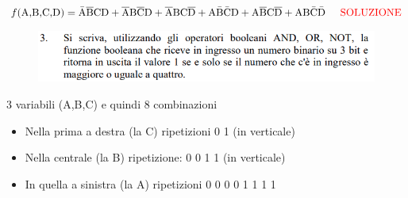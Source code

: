 \enlargethispage{90pt}
$ f(\text{A,B,C,D}) = \bar{\text{A}}\overline{\text{B}}\text{C}\text{D} + \overline{\text{A}}\text{B}\overline{\text{C}}\text{D} + \overline{\text{A}}\text{B}\text{C}\overline{\text{D}} + \text{A}\bar{\text{B}}\bar{\text{C}}\text{D} + \text{A}\overline{\text{B}}\text{C}\overline{\text{D}} + \text{AB}\bar{\text{C}}\bar{\text{D}} \hspace{0.5cm}\textrm{\color{red} SOLUZIONE}$ \\


\newpage

\begin{figure}[ht]
	\includegraphics[width=1\linewidth]{es3_pag10_AlgebraDiBoole}
	\label{fig:es3pag10algebradiboole}
\end{figure}

\textsf{{\small 3 variabili (A,B,C) e quindi 8 combinazioni}} \\
\begin{itemize}
	\item \textsf{{\small Nella prima a destra (la C) ripetizioni 0 1 (in verticale)}} \\
	\item \textsf{{\small Nella centrale (la B) ripetizione: 0 0 1 1 (in verticale)}} \\
	\item \textsf{{\small In quella a sinistra (la A) ripetizioni 0 0 0 0 1 1 1 1}} \\
\end{itemize}


